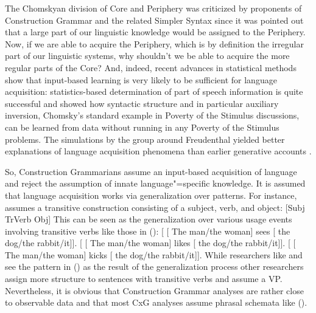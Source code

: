 The Chomskyan division of Core and Periphery was criticized by proponents of Construction Grammar
and the related Simpler Syntax since it was pointed out that a large part of our linguistic
knowledge would be assigned to the Periphery. Now, if we are able to acquire the Periphery, which is
by definition the irregular part of our linguistic systems, why shouldn't we be able to acquire the
more regular parts of the Core? And, indeed, recent advances in statistical methods show that
input-based learning is very likely to be sufficient for language acquisition: statistics-based
determination of part of speech information is quite successful and \citet{Bod2009a} showed how
syntactic structure and in particular auxiliary inversion, Chomsky's standard example in Poverty of the Stimulus
discussions, can be learned from data without running in any Poverty of the Stimulus problems. The
simulations by the group around Freudenthal yielded better explanations of language acquisition phenomena than
earlier generative accounts \citep{FPAG2007a}.

So, Construction Grammarians assume an input-based acquisition of language and reject the assumption
of innate language"=specific knowledge. It is assumed that language acquisition works via
generalization over patterns. For instance, \citet{Tomasello2003a} assumes a transitive construction
consisting of a subject, verb, and object:
\ea
{}[Subj TrVerb Obj]
\z
This can be seen as the generalization over various usage events involving transitive verbs like
those in ():
\eal
\label{Beispiele-fuer-Transitivkonstruktion}
\ex {}[ [ The man/the woman] sees  [ the dog/the rabbit/it]].
\ex {}[ [ The man/the woman] likes [ the dog/the rabbit/it]].
\ex {}[ [ The man/the woman] kicks [ the dog/the rabbit/it]].
\zl
While researchers like \citet{Croft2001a} and \citet{Tomasello2003a} see the pattern in () as the result of the
generalization process other researchers assign more structure to sentences with transitive verbs
and assume a VP. Nevertheless, it is obvious that Construction Grammar analyses are rather close to
observable data and that most CxG analyses assume phrasal schemata like (). 

